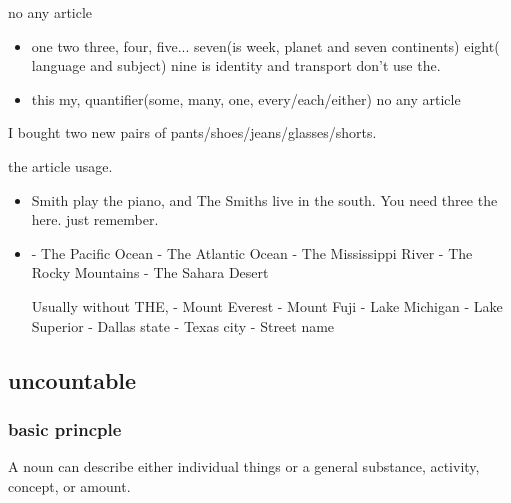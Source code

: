 \documentclass[a4paper,11pt,twoside]{book}
\begin{document}
\par no any article
\begin{itemize}
\item one two three, four, five... seven(is week, planet and seven continents) eight( language and subject) nine is identity and transport don't use the. 


\item this my, quantifier(some, many, one, every/each/either) no any article
\end{itemize}

\par I bought two new pairs of pants/shoes/jeans/glasses/shorts.

\par the article usage. 
\begin{itemize}

\item Smith play the piano, and The Smiths live in the south. You need three the here. just remember. 

\item - The Pacific Ocean
- The Atlantic Ocean
- The Mississippi River
- The Rocky Mountains
- The Sahara Desert

Usually without THE, 
- Mount Everest
- Mount Fuji
- Lake Michigan
- Lake Superior
- Dallas state
- Texas city
- Street name
\end{itemize}

\subsection{uncountable}
\subsubsection{basic princple}

\par A noun can describe either individual things or a general substance, activity, concept, or amount.
\end{document}
